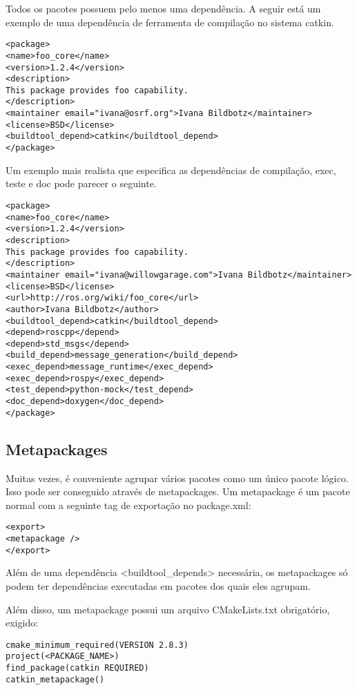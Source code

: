 Todos os pacotes possuem pelo menos uma dependência. A seguir está um exemplo de uma dependência de ferramenta de compilação no sistema catkin.

\begin{verbatim}
<package>
<name>foo_core</name>
<version>1.2.4</version>
<description>
This package provides foo capability.
</description>
<maintainer email="ivana@osrf.org">Ivana Bildbotz</maintainer>
<license>BSD</license>
<buildtool_depend>catkin</buildtool_depend>
</package>
\end{verbatim}

Um exemplo mais realista que especifica as dependências de compilação, exec, teste e doc pode parecer o seguinte.

\begin{verbatim}
<package>
<name>foo_core</name>
<version>1.2.4</version>
<description>
This package provides foo capability.
</description>
<maintainer email="ivana@willowgarage.com">Ivana Bildbotz</maintainer>
<license>BSD</license>
<url>http://ros.org/wiki/foo_core</url>
<author>Ivana Bildbotz</author>
<buildtool_depend>catkin</buildtool_depend>
<depend>roscpp</depend>
<depend>std_msgs</depend>
<build_depend>message_generation</build_depend>
<exec_depend>message_runtime</exec_depend>
<exec_depend>rospy</exec_depend>
<test_depend>python-mock</test_depend>
<doc_depend>doxygen</doc_depend>
</package>
\end{verbatim}


\subsection{Metapackages}


Muitas vezes, é conveniente agrupar vários pacotes como um único pacote lógico. Isso pode ser conseguido através de metapackages. Um metapackage é um pacote normal com a seguinte tag de exportação no package.xml:

\begin{verbatim}
<export>
<metapackage />
</export>
\end{verbatim}


Além de uma dependência <buildtool\_depends> necessária, os metapackages só podem ter dependências executadas em pacotes dos quais eles agrupam.

Além disso, um metapackage possui um arquivo CMakeLists.txt obrigatório, exigido:

\begin{verbatim}
cmake_minimum_required(VERSION 2.8.3)
project(<PACKAGE_NAME>)
find_package(catkin REQUIRED)
catkin_metapackage()\end{verbatim}

